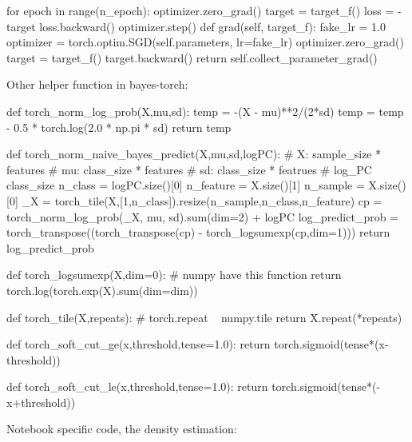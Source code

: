 \documentclass{article}
\begin{document}
\begin{python}
        for epoch in range(n_epoch):
            optimizer.zero_grad()
            target = target_f()
            loss = -target
            loss.backward()
            optimizer.step()
    def grad(self, target_f):
        fake_lr = 1.0
        optimizer = torch.optim.SGD(self.parameters, lr=fake_lr)
        optimizer.zero_grad()
        target = target_f()
        target.backward()
        return self.collect_parameter_grad()

\end{python}

Other helper function in bayes-torch:

\begin{python}
def torch_norm_log_prob(X,mu,sd):    
    temp = -(X - mu)**2/(2*sd) 
    temp = temp - 0.5 * torch.log(2.0 * np.pi * sd)
    return temp

def torch_norm_naive_bayes_predict(X,mu,sd,logPC):
    # X: sample_size * features
    # mu: class_size * features
    # sd: class_size * featrues
    # log_PC class_size
    n_class = logPC.size()[0]
    n_feature = X.size()[1]
    n_sample = X.size()[0]
    _X = torch_tile(X,[1,n_class]).resize(n_sample,n_class,n_feature)
    cp = torch_norm_log_prob(_X, mu, sd).sum(dim=2) + logPC  
    log_predict_prob = torch_transpose((torch_transpose(cp) - torch_logsumexp(cp,dim=1)))
    return log_predict_prob
    
def torch_logsumexp(X,dim=0):
    # numpy have this function
    return torch.log(torch.exp(X).sum(dim=dim))

def torch_tile(X,repeats):
    # torch.repeat ~ numpy.tile
    return X.repeat(*repeats)


def torch_soft_cut_ge(x,threshold,tense=1.0):
    return torch.sigmoid(tense*(x-threshold))

def torch_soft_cut_le(x,threshold,tense=1.0):
    return torch.sigmoid(tense*(-x+threshold))


\end{python}

Notebook specific code, the density estimation:
\end{document}
